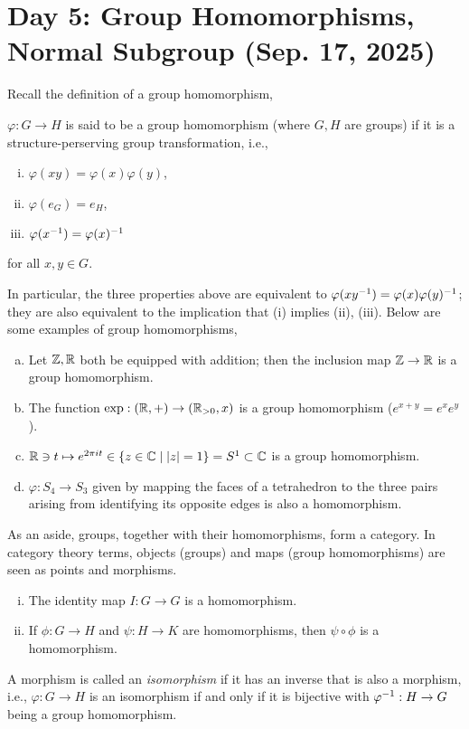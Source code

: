 \section{Day 5: Group Homomorphisms, Normal Subgroup (Sep. 17, 2025)}
Recall the definition of a group homomorphism,
\begin{definition}
    $\varphi : G \to H$ is said to be a group homomorphism (where $G, H$ are groups) if it is a structure-perserving group transformation, i.e.,
    \begin{enumerate}[(i)]
        \item $\varphi(xy) = \varphi(x) \varphi(y)$,
        \item $\varphi(e_G) = e_H$,
        \item $\varphi(x ^{-1}) = \varphi(x) ^{-1}$
    \end{enumerate}
    for all $x, y \in G$.
\end{definition}
\noindent In particular, the three properties above are equivalent to $\varphi(xy ^{-1}) = \varphi(x) \varphi(y) ^{-1}$; they are also equivalent to the implication that (i) implies (ii), (iii). Below are some examples of group homomorphisms,
\begin{enumerate}[(a)]
    \item Let $\mathbb Z, \mathbb R$ both be equipped with addition; then the inclusion map $\mathbb Z \to \mathbb R$ is a group homomorphism.
    \item The function $\exp : (\mathbb R, +) \to (\mathbb R_{>0}, x)$ is a group homomorphism ($e^{x+y} = e^x e^y$).
    \item $\mathbb R \ni t \mapsto e^{2\pi i t} \in \{z \in \mathbb C \mid \left\lvert z \right\rvert = 1\} = S^1 \subset \mathbb C$ is a group homomorphism.
    \item $\varphi : S_4 \to S_3$ given by mapping the faces of a tetrahedron to the three pairs arising from identifying its opposite edges is also a homomorphism. 
\end{enumerate}
\noindent As an aside, groups, together with their homomorphisms, form a category. In category theory terms, objects (groups) and maps (group homomorphisms) are seen as points and morphisms.
\begin{enumerate}[(i)]
    \item The identity map $I : G \to G$ is a homomorphism.
    \item If $\phi : G \to H$ and $\psi : H \to K$ are homomorphisms, then $\psi \circ \phi$ is a homomorphism.
\end{enumerate}
A morphism is called an \textit{isomorphism} if it has an inverse that is also a morphism, i.e., $\varphi : G \to H$ is an isomorphism if and only if it is bijective with $\varphi ^{-1} : H \to G$ being a group homomorphism.
